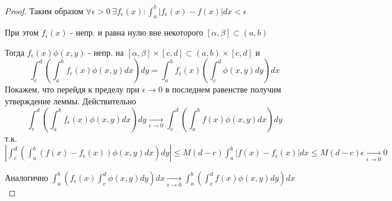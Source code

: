 \documentclass{article}
\begin{document}
\begin{proof}
  Таким образом $\forall \epsilon > 0 \ \exists f_\epsilon(x): \int_{a}^{b}|f_\epsilon(x)-f(x)|dx<\epsilon$

  При этом $f_{\epsilon}(x)$ - непр. и равна нулю вне некоторого $[\alpha,\beta]\subset(a,b)$

  Тогда $f_\epsilon(x)\phi(x,y)$ - непр. на $[\alpha,\beta]\times [c,d] \subset (a,b)\times [c,d]$ и
  \[
    \int_{c}^{d}(\int_{a}^{b}f_\epsilon(x)\phi(x,y)dx)dy=\int_{a}^{b}f_\epsilon(x)(\int_{c}^{d}\phi(x,y)dy)dx
  \]
  Покажем, что перейдя к пределу при $\epsilon \to 0$ в последнем равенстве получим
  утверждение леммы.
  Действительно
  \[
    \int_{c}^{d}(\int_{a}^{b}f_{\epsilon}(x)\phi(x,y)dx)dy \underset{\epsilon\to 0}{\to}\int_{c}^{d}(\int_{a}^{b}f(x)\phi(x,y)dx)dy
  \]
  т.к. $|\int_{c}^{d}(\int_{a}^{b}(f(x)-f_\epsilon(x))\phi(x,y)dx)dy| \le M(d-c)\int_{a}^{b}|f(x)-f_\epsilon(x)|dx \le M(d-c)\epsilon \underset{\epsilon\to 0}{\to}0$
  
  Аналогично $\int_{a}^{b}(f_\epsilon(x)\int_{c}^{d}\phi(x,y)dy)dx \underset{\epsilon\to 0}{\to}\int_{a}^{b}(\int_{c}^{d}f(x)\phi(x,y)dy)dx$
\end{proof}

\end{document}
